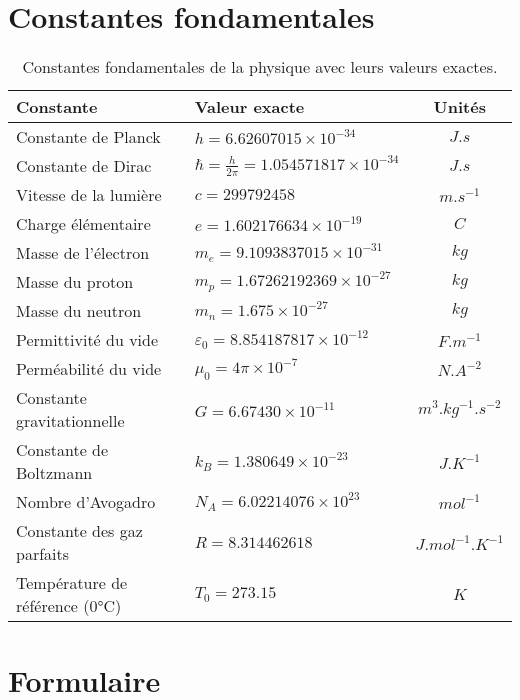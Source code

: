 \documentclass[a4paper,10pt]{report}
\begin{document}
	\section{Constantes fondamentales}\label{subsec:constantes}
	\begin{table}[H]
		\centering
		\begin{tabular}{llc}
			\toprule
			\textbf{Constante} & \textbf{Valeur exacte} & \textbf{Unités} \\
			\midrule
			Constante de Planck & $h = 6.62607015 \times 10^{-34}$ & $\si{J.s}$ \\
			Constante de Dirac & $\hbar = \frac{h}{2\pi} = 1.054571817 \times 10^{-34}$ & $\si{J.s}$ \\
			Vitesse de la lumière & $c = 299792458$ & $\si{m.s^{-1}}$ \\
			Charge élémentaire & $e = 1.602176634 \times 10^{-19}$ & $\si{C}$ \\
			Masse de l'électron & $m_e = 9.1093837015 \times 10^{-31}$ & $\si{kg}$ \\
			Masse du proton & $m_p = 1.67262192369 \times 10^{-27}$ & $\si{kg}$ \\
			Masse du neutron & $m_n = 1.675 \times 10^{-27}$ & $\si{kg}$ \\
			Permittivité du vide & $\varepsilon_0 = 8.854187817 \times 10^{-12}$ & $\si{F.m^{-1}}$ \\
			Perméabilité du vide & $\mu_0 = 4\pi \times 10^{-7}$ & $\si{N.A^{-2}}$ \\
			Constante gravitationnelle & $G = 6.67430 \times 10^{-11}$ & $\si{m^3.kg^{-1}.s^{-2}}$ \\
			Constante de Boltzmann & $k_B = 1.380649 \times 10^{-23}$ & $\si{J.K^{-1}}$ \\
			Nombre d'Avogadro & $N_A = 6.02214076 \times 10^{23}$ & $\si{mol^{-1}}$ \\
			Constante des gaz parfaits & $R = 8.314462618$ & $\si{J.mol^{-1}.K^{-1}}$ \\
			Température de référence (0°C) & $T_0 = 273.15$ & $\si{K}$ \\
			\bottomrule
		\end{tabular}
		\caption{Constantes fondamentales de la physique avec leurs valeurs exactes.}
		\label{table:constantes}
	\end{table}
	\section{Formulaire}\label{subsec:formulaire}
\end{document}
